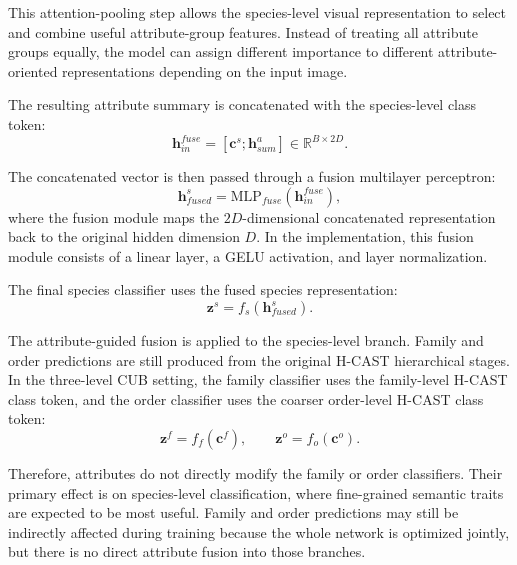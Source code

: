 This attention-pooling step allows the species-level visual representation to select and combine useful attribute-group features. Instead of treating all attribute groups equally, the model can assign different importance to different attribute-oriented representations depending on the input image.

The resulting attribute summary is concatenated with the species-level class token:
\begin{equation}
    \mathbf{h}^{fuse}_{in}
    =
    [
        \mathbf{c}^{s};
        \mathbf{h}^{a}_{sum}
    ]
    \in
    \mathbb{R}^{B \times 2D}.
\end{equation}

The concatenated vector is then passed through a fusion multilayer perceptron:
\begin{equation}
    \mathbf{h}^{s}_{fused}
    =
    \mathrm{MLP}_{fuse}
    \left(
        \mathbf{h}^{fuse}_{in}
    \right),
\end{equation}
where the fusion module maps the \(2D\)-dimensional concatenated representation back to the original hidden dimension \(D\). In the implementation, this fusion module consists of a linear layer, a GELU activation, and layer normalization.

The final species classifier uses the fused species representation:
\begin{equation}
    \mathbf{z}^{s}
    =
    f_s
    \left(
        \mathbf{h}^{s}_{fused}
    \right).
\end{equation}

The attribute-guided fusion is applied to the species-level branch. Family and order predictions are still produced from the original H-CAST hierarchical stages. In the three-level CUB setting, the family classifier uses the family-level H-CAST class token, and the order classifier uses the coarser order-level H-CAST class token:
\begin{equation}
    \mathbf{z}^{f}
    =
    f_f(\mathbf{c}^{f}),
    \qquad
    \mathbf{z}^{o}
    =
    f_o(\mathbf{c}^{o}).
\end{equation}

Therefore, attributes do not directly modify the family or order classifiers. Their primary effect is on species-level classification, where fine-grained semantic traits are expected to be most useful. Family and order predictions may still be indirectly affected during training because the whole network is optimized jointly, but there is no direct attribute fusion into those branches.

